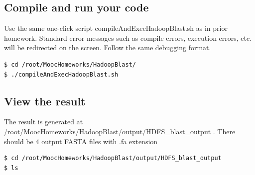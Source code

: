 \subsection*{Compile and run your code}
Use the same one-click script compileAndExecHadoopBlast.sh as in prior
homework. Standard error messages such as compile errors, execution errors,
etc. will be redirected on the screen. Follow the same debugging format.

\begin{lstlisting}[language=bash]
$ cd /root/MoocHomeworks/HadoopBlast/
$ ./compileAndExecHadoopBlast.sh 
\end{lstlisting}

\subsection*{View the result} 
The result is generated at
/root/MoocHomeworks/HadoopBlast/output/HDFS\_blast\_output . There should be 4
output FASTA files with .fa extension

\begin{lstlisting}[language=bash]
$ cd /root/MoocHomeworks/HadoopBlast/output/HDFS_blast_output
$ ls
\end{lstlisting}
